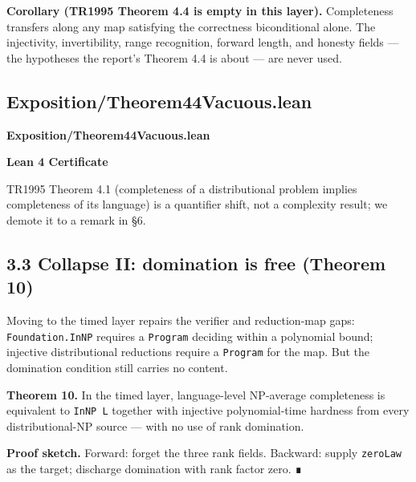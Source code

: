 \documentclass[11pt,a4paper]{article}
\begin{document}
\textbf{Corollary (TR1995 Theorem 4.4 is empty in this layer).} Completeness transfers along any map satisfying the correctness biconditional alone. The injectivity, invertibility, range recognition, forward length, and honesty fields --- the hypotheses the report's Theorem 4.4 is about --- are never used.

\hypertarget{exposition-theorem44vacuous-lean}{%
\subsection{Exposition/Theorem44Vacuous.lean}\label{exposition-theorem44vacuous-lean}}

\noindent\textbf{Exposition/Theorem44Vacuous.lean}

\vspace{0.75\baselineskip}
\noindent\textcolor{green!40!black}{\textbf{Lean 4 Certificate}}\par\vspace{0.25\baselineskip}

\vspace{0.75\baselineskip}

TR1995 Theorem 4.1 (completeness of a distributional problem implies completeness of its language) is a quantifier shift, not a complexity result; we demote it to a remark in §6.

\hypertarget{collapse-ii-domination-is-free-theorem-10}{%
\subsection{3.3 Collapse II: domination is free (Theorem 10)}\label{collapse-ii-domination-is-free-theorem-10}}

Moving to the timed layer repairs the verifier and reduction-map gaps: \texttt{Foundation.InNP} requires a \texttt{Program} deciding within a polynomial bound; injective distributional reductions require a \texttt{Program} for the map. But the domination condition still carries no content.

\textbf{Theorem 10.} In the timed layer, language-level NP-average completeness is equivalent to \texttt{InNP\ L} together with injective polynomial-time hardness from every distributional-NP source --- with no use of rank domination.

\textbf{Proof sketch.} Forward: forget the three rank fields. Backward: supply \texttt{zeroLaw} as the target; discharge domination with rank factor zero. ∎
\end{document}
